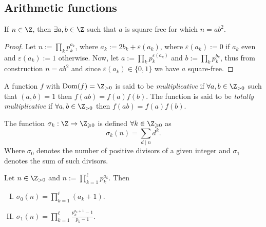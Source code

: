 \subsection{Arithmetic functions}

\begin{proposition}
    If \(n \in \Z\), then \(\exists a, b \in \Z\) such that \(a\)
    is square free for which  \(n = ab^2\).
\end{proposition}

\begin{proof}
    Let \(n := \prod_k p_k^{a_k}\), where \(a_k := 2 b_k + \varepsilon(a_k)\),
    where \(\varepsilon(a_k) := 0\) if \(a_k\) even and \(\varepsilon(a_k) := 1\)
    otherwise. Now, let \(a := \prod_k p_k^{\varepsilon(a_k)}\) and \(b :=
    \prod_k p_k^{b_k}\), thus from construction  \(n = a b^2\) and since
    \(\varepsilon(a_k) \in \{0, 1\}\) we have \(a\) square-free.
\end{proof}

\begin{definition}
    A function \(f\) with \(\mathrm{Dom}(f) = \Z_{>0}\) is said to be
    \emph{multiplicative} if \(\forall a, b \in \Z_{>0}\) such that
    \((a,b) = 1\) then  \(f(ab) = f(a)f(b)\). The function is said to be
    \emph{totally multiplicative} if  \(\forall a, b \in \Z_{>0}\) then
    \(f(ab) = f(a)f(b)\).
\end{definition}

\begin{definition}
    The function \(\sigma_k: \Z \to \Z_{\geqslant 0}\) is defined
    \(\forall k \in \Z_{\geqslant 0}\) as
    \[
        \sigma_k(n) = \sum_{d\mid n} d^k.
    \]
    Where \(\sigma_0\) denotes the number of positive divisors of a given integer
    and \(\sigma_1\) denotes the sum of such divisors.
\end{definition}

\begin{proposition}
    Let \(n \in \Z_{>0}\) and \(n := \prod_{k = 1}^\ell
    p_k^{a_k}\). Then
    \begin{enumerate}[I.]
        \item \(\sigma_0(n) = \prod_{k = 1}^{\ell} (a_k + 1)\).
        \item  \(\sigma_1(n) = \prod_{k=1}^\ell \frac{p_k^{a_k+1} - 1}{p_k - 1}\).
    \end{enumerate}
\end{proposition}

